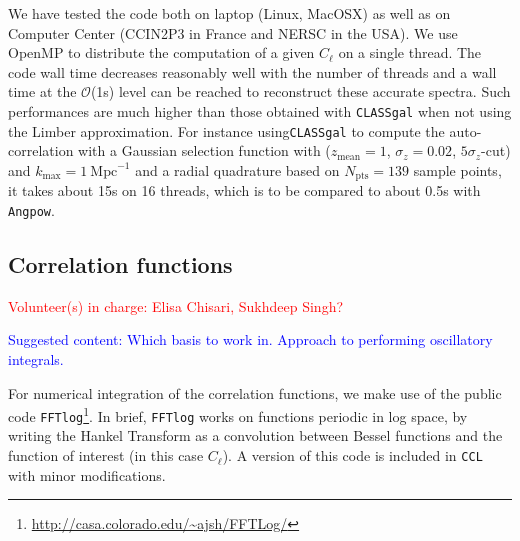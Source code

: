 \documentclass[\docopts]{\docclass}
\newcommand{\vol}[1]{\textcolor{red}{Volunteer(s) in charge: #1}}
\newcommand{\cont}[1]{\textcolor{blue}{Suggested content: #1}}
\newcommand{\mrm}[1]{\mathrm{#1}}
\newcommand{\ccl}{{\tt CCL}\xspace}
\begin{document}
We have tested the code both on laptop (Linux, MacOSX) as well as on
Computer Center (CCIN2P3 in France and NERSC in the USA). 
We use OpenMP to distribute the computation of a given $C_\ell$ on a single
thread. The code wall time  decreases reasonably well with the number of threads
and a wall time at the $\mathcal{O}$(1s) level can be reached to
reconstruct these accurate spectra. Such performances are much higher than those obtained
with {\tt CLASSgal} when not using the Limber approximation.
For instance using{\tt CLASSgal}  to compute the auto-correlation with a Gaussian selection function with ($z_\mrm{mean}=1$, $\sigma_z=0.02$, $5\sigma_z$-cut) and $k_\mrm{max}=1\ \mrm{Mpc}^{-1}$ and a radial quadrature based on $N_\mrm{pts}=139$ sample points, it takes
about 15s on 16 threads, which is to be compared to about 0.5s with \texttt{Angpow}.



\subsection{Correlation functions}
\vol{Elisa Chisari, Sukhdeep Singh?}

\cont{Which basis to work in. Approach to performing oscillatory integrals.}

For numerical integration of the correlation functions, we make use of the public code {\tt FFTlog}\footnote{\url{http://casa.colorado.edu/~ajsh/FFTLog/}}\citep{Hamilton2000,Talman2009}. In brief, {\tt FFTlog} works on functions periodic in log space, by writing the Hankel Transform as a convolution between Bessel functions and the function of interest (in this case $C_\ell$). A version of this code is included in \ccl with minor modifications.
\end{document}
